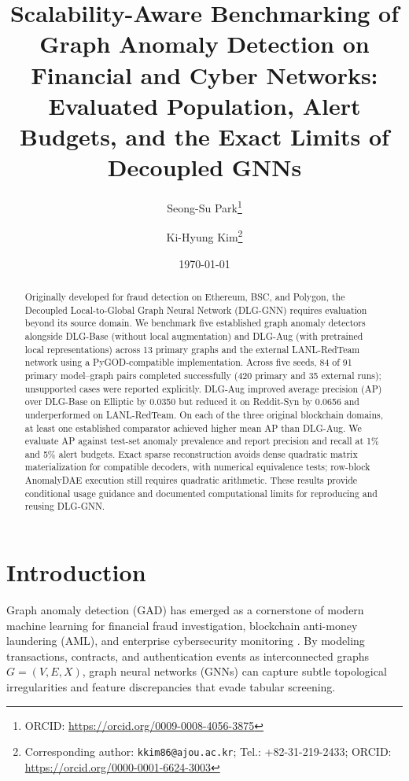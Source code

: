 \documentclass[11pt,a4paper]{article}
\title{\textbf{\Large Scalability-Aware Benchmarking of Graph Anomaly Detection on Financial and Cyber Networks: Evaluated Population, Alert Budgets, and the Exact Limits of Decoupled GNNs}}
\author[1]{Seong-Su Park\thanks{ORCID: \url{https://orcid.org/0009-0008-4056-3875}}}
\author[2]{Ki-Hyung Kim\thanks{Corresponding author: \texttt{kkim86@ajou.ac.kr}; Tel.: +82-31-219-2433; ORCID: \url{https://orcid.org/0000-0001-6624-3003}}}
\affil[1]{\small Department of Computer Engineering, Ajou University, Suwon 16499, Republic of Korea; \texttt{parky@ajou.ac.kr}}
\affil[2]{\small Department of Cyber Security, Ajou University, Suwon 16499, Republic of Korea; \texttt{kkim86@ajou.ac.kr}}
\date{\today}
\begin{document}
\maketitle

\begin{abstract}
Originally developed for fraud detection on Ethereum, BSC, and Polygon, the Decoupled Local-to-Global Graph Neural Network (DLG-GNN) requires evaluation beyond its source domain. We benchmark five established graph anomaly detectors alongside DLG-Base (without local augmentation) and DLG-Aug (with pretrained local representations) across 13 primary graphs and the external LANL-RedTeam network using a PyGOD-compatible implementation. Across five seeds, 84 of 91 primary model--graph pairs completed successfully (420 primary and 35 external runs); unsupported cases were reported explicitly. DLG-Aug improved average precision (AP) over DLG-Base on Elliptic by 0.0350 but reduced it on Reddit-Syn by 0.0656 and underperformed on LANL-RedTeam. On each of the three original blockchain domains, at least one established comparator achieved higher mean AP than DLG-Aug. We evaluate AP against test-set anomaly prevalence and report precision and recall at 1\% and 5\% alert budgets. Exact sparse reconstruction avoids dense quadratic matrix materialization for compatible decoders, with numerical equivalence tests; row-block AnomalyDAE execution still requires quadratic arithmetic. These results provide conditional usage guidance and documented computational limits for reproducing and reusing DLG-GNN.
\end{abstract}

\par

\section{Introduction}
\label{sec:introduction}
Graph anomaly detection (GAD) has emerged as a cornerstone of modern machine learning for financial fraud investigation, blockchain anti-money laundering (AML), and enterprise cybersecurity monitoring \cite{ma2023survey,qiao2025survey,dilini2026comprehensive}. By modeling transactions, contracts, and authentication events as interconnected graphs $G=(V, E, X)$, graph neural networks (GNNs) can capture subtle topological irregularities and feature discrepancies that evade tabular screening.
\end{document}
